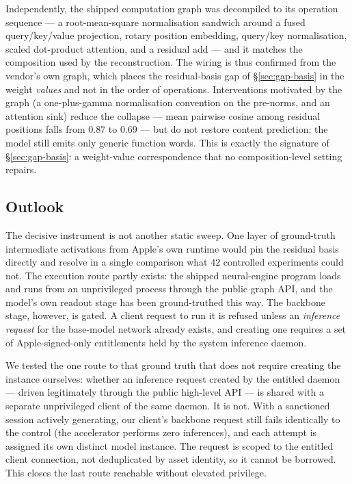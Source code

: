 Independently, the shipped computation graph was decompiled to its operation sequence --- a
root-mean-square normalisation sandwich around a fused query/key/value projection, rotary position
embedding, query/key normalisation, scaled dot-product attention, and a residual add --- and it
matches the composition used by the reconstruction. The wiring is thus confirmed from the vendor's
own graph, which places the residual-basis gap of \S\ref{sec:gap-basis} in the weight \emph{values}
and not in the order of operations. Interventions motivated by the graph (a one-plus-gamma
normalisation convention on the pre-norms, and an attention sink) reduce the collapse --- mean
pairwise cosine among residual positions falls from $0.87$ to $0.69$ --- but do not restore content
prediction; the model still emits only generic function words. This is exactly the signature of
\S\ref{sec:gap-basis}: a weight-value correspondence that no composition-level setting repairs.

\subsection{Outlook}

The decisive instrument is not another static sweep. One layer of ground-truth intermediate
activations from Apple's own runtime would pin the residual basis directly and resolve in a single
comparison what $42$ controlled experiments could not. The execution route partly exists: the
shipped neural-engine program loads and runs from an unprivileged process through the public graph
API, and the model's own readout stage has been ground-truthed this way. The backbone stage,
however, is gated. A client request to run it is refused unless an \emph{inference request} for
the base-model network already exists, and creating one requires a set of Apple-signed-only
entitlements held by the system inference daemon.

We tested the one route to that ground truth that does not require creating the instance
ourselves: whether an inference request created by the entitled daemon --- driven legitimately
through the public high-level API --- is shared with a separate unprivileged client of the same
daemon. It is not. With a sanctioned session actively generating, our client's backbone request
still fails identically to the control (the accelerator performs zero inferences), and each
attempt is assigned its own distinct model instance. The request is scoped to the entitled client
connection, not deduplicated by asset identity, so it cannot be borrowed. This closes the last
route reachable without elevated privilege.

